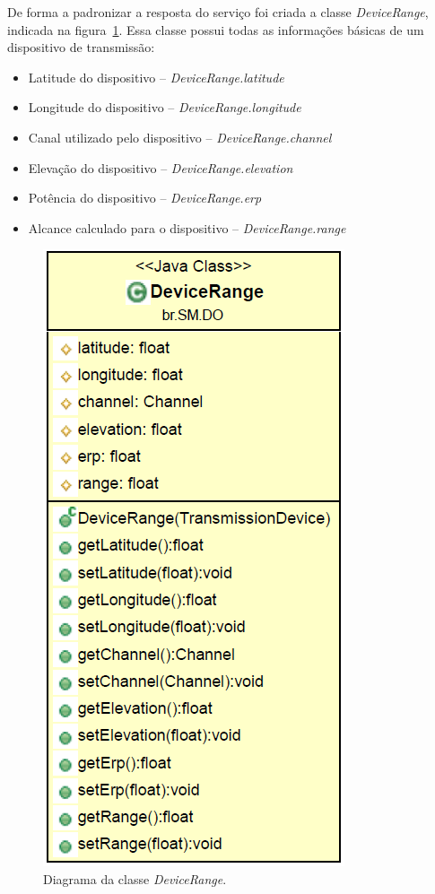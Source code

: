 De forma a padronizar a resposta do serviço foi criada a classe \textit{DeviceRange}, indicada na figura~\ref{fig:devicerange}. Essa classe possui todas as informações básicas de um dispositivo de transmissão:

\begin{itemize}
\item Latitude do dispositivo -- \textit{DeviceRange.latitude}
\item Longitude do dispositivo -- \textit{DeviceRange.longitude}
\item Canal utilizado pelo dispositivo -- \textit{DeviceRange.channel}
\item Elevação do dispositivo -- \textit{DeviceRange.elevation}
\item Potência do dispositivo -- \textit{DeviceRange.erp}
\item Alcance calculado para o dispositivo -- \textit{DeviceRange.range}
\end{itemize}

\begin{figure}[htb]
\centering
\includegraphics[height=0.4\textheight]{figs/devicerange}
\caption[\textit{Diagrama da classe \textit{DeviceRange} }.]
{Diagrama da classe \textit{DeviceRange}.}
\label{fig:devicerange}
\end{figure} 

